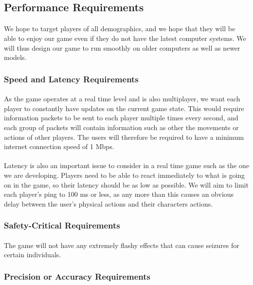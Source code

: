 \documentclass[12pt, titlepage]{article}
\begin{document}
\subsection{Performance Requirements}
\paragraph{}We hope to target players of all demographics, and we hope that they will be able to enjoy our game even if they do not have the latest computer systems. We will thus design our game to run smoothly on older computers as well as newer models.
\subsubsection{Speed and Latency Requirements}
\paragraph{}As the game operates at a real time level and is also multiplayer, we want each player to constantly have updates on the current game state. This would require information packets to be sent to each player multiple times every second, and each group of packets will contain information such as other the movements or actions of other players. The users will therefore be required to have a minimum internet connection speed of 1 Mbps. 
\paragraph{}Latency is also an important issue to consider in a real time game such as the one we are developing. Players need to be able to react immediately to what is going on in the game, so their latency should be as low as possible. We will aim to limit each player's ping to 100 ms or less, as any more than this causes an obvious delay between the user's physical actions and their characters actions. 
\subsubsection{Safety-Critical Requirements}
\paragraph{}The game will not have any extremely flashy effects that can cause seizures for certain individuals. 
\subsubsection{Precision or Accuracy Requirements}
\end{document}
